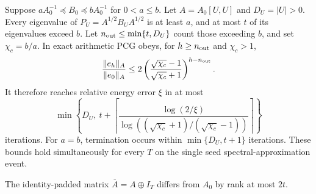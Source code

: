 \begin{theorem}\label{thm:seedpcg}
Suppose $aA_0^{-1}\preceq B_0\preceq bA_0^{-1}$ for $0<a\leq b$.
Let $A=A_0[U,U]$ and $D_U=|U|>0$. Every eigenvalue of
$P_U=A^{1/2}B_UA^{1/2}$ is at least $a$, and at most $t$ of its
eigenvalues exceed $b$. Let $n_{\rm out}\leq\min\{t,D_U\}$ count those
exceeding $b$, and set $\chi_c=b/a$. In exact arithmetic PCG obeys,
for $h\geq n_{\rm out}$ and $\chi_c>1$,
\[
 \frac{\|e_h\|_A}{\|e_0\|_A}
 \leq 2\left(\frac{\sqrt{\chi_c}-1}{\sqrt{\chi_c}+1}\right)^{h-n_{\rm out}}.
\]
It therefore reaches relative energy error $\xi$ in at most
\[
 \min\left\{D_U,\ t+
 \left\lceil\frac{\log(2/\xi)}{
 \log((\sqrt{\chi_c}+1)/(\sqrt{\chi_c}-1))}\right\rceil\right\}
\]
iterations. For $a=b$, termination occurs within $\min\{D_U,t+1\}$
iterations. These bounds hold simultaneously for every $T$ on the
single seed spectral-approximation event.

The identity-padded matrix $\overline A=A\oplus I_T$ differs from
$A_0$ by rank at most $2t$.
\end{theorem}
